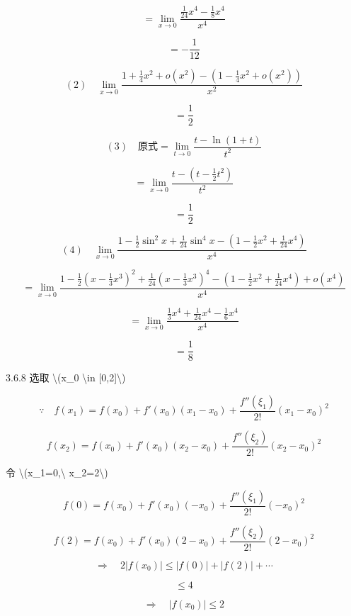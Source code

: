 \documentclass[UTF8,fontset=windows]{ctexart}
\begin{document}
\[
=\lim_{x\to0}\frac{\frac{1}{24}x^4-\frac{1}{8}x^4}{x^4}
\]

\[
=-\frac{1}{12}
\]

\[
(2)\quad \lim_{x\to0}\frac{1+\frac{1}{4}x^2+o(x^2)-\left(1-\frac{1}{4}x^2+o(x^2)\right)}{x^2}
\]

\[
=\frac{1}{2}
\]

\[
(3)\quad \text{原式}=\lim_{t\to0}\frac{t-\ln(1+t)}{t^2}
\]

\[
=\lim_{x\to0}\frac{t-\left(t-\frac{1}{2}t^2\right)}{t^2}
\]

\[
=\frac{1}{2}
\]

\[
(4)\quad \lim_{x\to0}\frac{1-\frac{1}{2}\sin^2x+\frac{1}{24}\sin^4x-\left(1-\frac{1}{2}x^2+\frac{1}{24}x^4\right)}{x^4}
\]

\[
=\lim_{x\to0}\frac{1-\frac{1}{2}\left(x-\frac{1}{3}x^3\right)^2+\frac{1}{24}\left(x-\frac{1}{3}x^3\right)^4-\left(1-\frac{1}{2}x^2+\frac{1}{24}x^4\right)+o(x^4)}{x^4}
\]

\[
=\lim_{x\to0}\frac{\frac{1}{3}x^4+\frac{1}{24}x^4-\frac{1}{6}x^4}{x^4}
\]

\[
=\frac{1}{8}
\]

\newpage

3.6.8 选取 \textbackslash{}(x\_0 \textbackslash{}in [0,2]\textbackslash{})

\[
\because\quad f(x_1)=f(x_0)+f'(x_0)(x_1-x_0)+\frac{f''(\xi_1)}{2!}(x_1-x_0)^2
\]

\[
f(x_2)=f(x_0)+f'(x_0)(x_2-x_0)+\frac{f''(\xi_2)}{2!}(x_2-x_0)^2
\]

令 \textbackslash{}(x\_1=0,\textbackslash{} x\_2=2\textbackslash{})

\[
f(0)=f(x_0)+f'(x_0)(-x_0)+\frac{f''(\xi_1)}{2!}(-x_0)^2
\]

\[
f(2)=f(x_0)+f'(x_0)(2-x_0)+\frac{f''(\xi_2)}{2!}(2-x_0)^2
\]

\[
\Rightarrow\quad 2|f(x_0)|\le |f(0)|+|f(2)|+\cdots
\]

\[
\le 4
\]

\[
\Rightarrow\quad |f(x_0)|\le 2
\]
\end{document}
